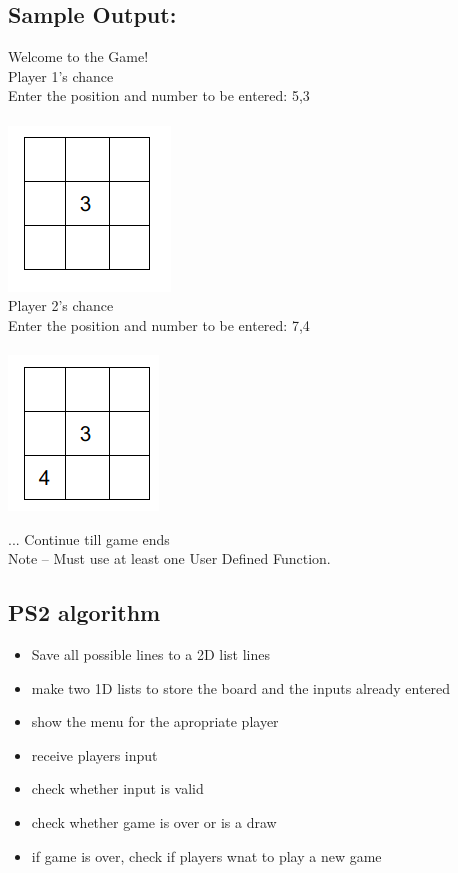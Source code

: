 \documentclass{article}
\begin{document}
    \subsection{Sample Output:}
    Welcome to the Game!\\
    Player 1’s chance\\
    Enter the position and number to be entered: 5,3\\ \\
    \includegraphics[width=.2\textwidth]{./images/ps1_ps_001.png}
    \\Player 2’s chance\\
    Enter the position and number to be entered: 7,4\\ \\
    \includegraphics[width=.2\textwidth]{./images/ps1_ps_002.png}

    ... Continue till game ends\\
    Note – Must use at least one User Defined Function.


    \subsection{PS2 algorithm}
    \begin{itemize}
        \item Save all possible lines to a 2D list lines
        \item make two 1D lists to store the board and the inputs already entered
        \item show the menu for the apropriate player
        \item receive players input
        \item check whether input is valid
        \item check whether game is over or is a draw
        \item if game is over, check if players wnat to play a new game
    \end{itemize}
\end{document}
